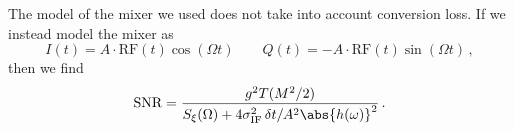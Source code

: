 The model of the mixer we used does not take into account conversion loss.
If we instead model the mixer as
\begin{equation}
  I(t) = A \cdot \text{RF}(t) \cos(\Omega t) \qquad Q(t) = - A \cdot \text{RF}(t) \sin(\Omega t) \, ,
\end{equation}
then we find
\begin{equation}
  \text{SNR} = \frac{g^2 T (M^2/2)}{S_\xi(\Omega) + 4 \sigma_\text{IF}^2 \, \delta t / A^2 \abs{h(\omega)}^2}
  \, .
\end{equation}

